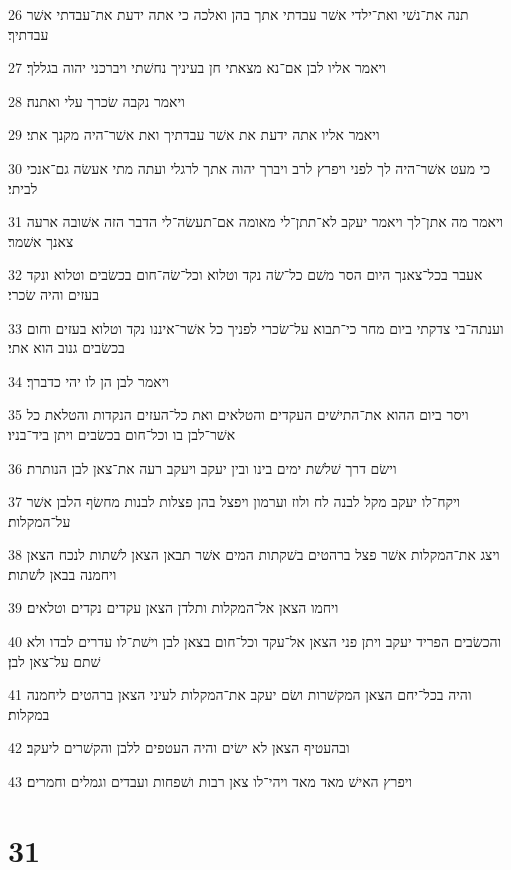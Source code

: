 \par 26 תנה את־נשׁי ואת־ילדי אשׁר עבדתי אתך בהן ואלכה כי אתה ידעת את־עבדתי אשׁר עבדתיך׃
\par 27 ויאמר אליו לבן אם־נא מצאתי חן בעיניך נחשׁתי ויברכני יהוה בגללך׃
\par 28 ויאמר נקבה שׂכרך עלי ואתנה׃
\par 29 ויאמר אליו אתה ידעת את אשׁר עבדתיך ואת אשׁר־היה מקנך אתי׃
\par 30 כי מעט אשׁר־היה לך לפני ויפרץ לרב ויברך יהוה אתך לרגלי ועתה מתי אעשׂה גם־אנכי לביתי׃
\par 31 ויאמר מה אתן־לך ויאמר יעקב לא־תתן־לי מאומה אם־תעשׂה־לי הדבר הזה אשׁובה ארעה צאנך אשׁמר׃
\par 32 אעבר בכל־צאנך היום הסר משׁם כל־שׂה נקד וטלוא וכל־שׂה־חום בכשׂבים וטלוא ונקד בעזים והיה שׂכרי׃
\par 33 וענתה־בי צדקתי ביום מחר כי־תבוא על־שׂכרי לפניך כל אשׁר־איננו נקד וטלוא בעזים וחום בכשׂבים גנוב הוא אתי׃
\par 34 ויאמר לבן הן לו יהי כדברך׃
\par 35 ויסר ביום ההוא את־התישׁים העקדים והטלאים ואת כל־העזים הנקדות והטלאת כל אשׁר־לבן בו וכל־חום בכשׂבים ויתן ביד־בניו׃
\par 36 וישׂם דרך שׁלשׁת ימים בינו ובין יעקב ויעקב רעה את־צאן לבן הנותרת׃
\par 37 ויקח־לו יעקב מקל לבנה לח ולוז וערמון ויפצל בהן פצלות לבנות מחשׂף הלבן אשׁר על־המקלות׃
\par 38 ויצג את־המקלות אשׁר פצל ברהטים בשׁקתות המים אשׁר תבאן הצאן לשׁתות לנכח הצאן ויחמנה בבאן לשׁתות׃
\par 39 ויחמו הצאן אל־המקלות ותלדן הצאן עקדים נקדים וטלאים׃
\par 40 והכשׂבים הפריד יעקב ויתן פני הצאן אל־עקד וכל־חום בצאן לבן וישׁת־לו עדרים לבדו ולא שׁתם על־צאן לבן׃
\par 41 והיה בכל־יחם הצאן המקשׁרות ושׂם יעקב את־המקלות לעיני הצאן ברהטים ליחמנה במקלות׃
\par 42 ובהעטיף הצאן לא ישׂים והיה העטפים ללבן והקשׁרים ליעקב׃
\par 43 ויפרץ האישׁ מאד מאד ויהי־לו צאן רבות ושׁפחות ועבדים וגמלים וחמרים׃

\chapter{31}

